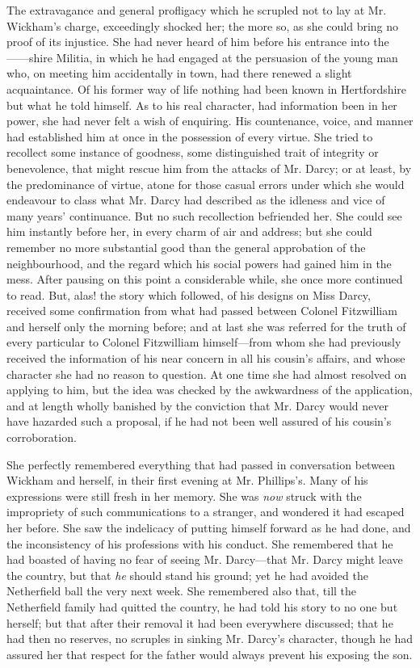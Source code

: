The extravagance and general profligacy which he scrupled not to lay at Mr. Wickham's charge, exceedingly shocked her; the more so, as she could bring no proof of its injustice. She had never heard of him before his entrance into the ------shire Militia, in which he had engaged at the persuasion of the young man who, on meeting him accidentally in town, had there renewed a slight acquaintance. Of his former way of life nothing had been known in Hertfordshire but what he told himself. As to his real character, had information been in her power, she had never felt a wish of enquiring. His countenance, voice, and manner had established him at once in the possession of every virtue. She tried to recollect some instance of goodness, some distinguished trait of integrity or benevolence, that might rescue him from the attacks of Mr. Darcy; or at least, by the predominance of virtue, atone for those casual errors under which she would endeavour to class what Mr. Darcy had described as the idleness and vice of many years' continuance. But no such recollection befriended her. She could see him instantly before her, in every charm of air and address; but she could remember no more substantial good than the general approbation of the neighbourhood, and the regard which his social powers had gained him in the mess. After pausing on this point a considerable while, she once more continued to read. But, alas! the story which followed, of his designs on Miss Darcy, received some confirmation from what had passed between Colonel Fitzwilliam and herself only the morning before; and at last she was referred for the truth of every particular to Colonel Fitzwilliam himself---from whom she had previously received the information of his near concern in all his cousin's affairs, and whose character she had no reason to question. At one time she had almost resolved on applying to him, but the idea was checked by the awkwardness of the application, and at length wholly banished by the conviction that Mr. Darcy would never have hazarded such a proposal, if he had not been well assured of his cousin's corroboration.

She perfectly remembered everything that had passed in conversation between Wickham and herself, in their first evening at Mr. Phillips's. Many of his expressions were still fresh in her memory. She was {\em now} struck with the impropriety of such communications to a stranger, and wondered it had escaped her before. She saw the indelicacy of putting himself forward as he had done, and the inconsistency of his professions with his conduct. She remembered that he had boasted of having no fear of seeing Mr. Darcy---that Mr. Darcy might leave the country, but that {\em he} should stand his ground; yet he had avoided the Netherfield ball the very next week. She remembered also that, till the Netherfield family had quitted the country, he had told his story to no one but herself; but that after their removal it had been everywhere discussed; that he had then no reserves, no scruples in sinking Mr. Darcy's character, though he had assured her that respect for the father would always prevent his exposing the son.

